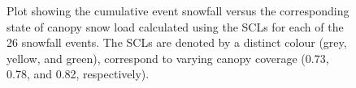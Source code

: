 \documentclass[
  letterpaper,
  DIV=11,
  numbers=noendperiod]{scrartcl}
\begin{document}
\begin{figure}[H]


\caption{\label{fig-scl-w-sf}Plot showing the cumulative event snowfall
versus the corresponding state of canopy snow load calculated using the
SCLs for each of the 26 snowfall events. The SCLs are denoted by a
distinct colour (grey, yellow, and green), correspond to varying canopy
coverage (0.73, 0.78, and 0.82, respectively).}

\end{figure}%

\pagebreak
{}
\end{document}

